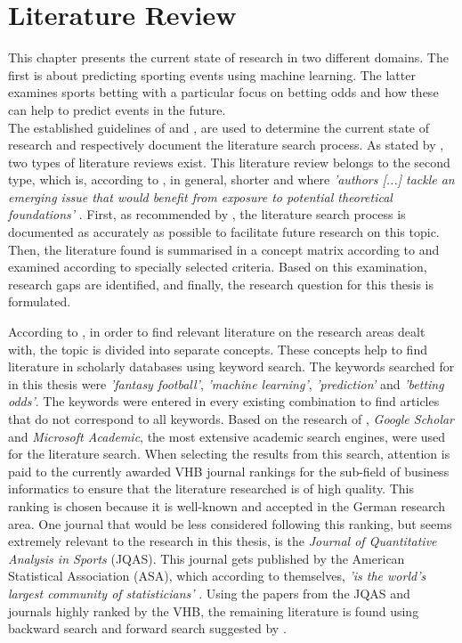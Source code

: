 \chapter{Literature Review}
This chapter presents the current state of research in two different domains. The first is about predicting sporting events using machine learning. The latter examines sports betting with a particular focus on betting odds and how these can help to predict events in the future. \\
\indent The established guidelines of \citet{vom_brocke_standing_2015} and \citet{webster_guest_2002}, are used to determine the current state of research and respectively document the literature search process. As stated by \citet{webster_guest_2002}, two types of literature reviews exist. This literature review belongs to the second type, which is, according to \citeauthor{webster_guest_2002}, in general, shorter and where \emph{'authors [...] tackle an emerging issue that would benefit from exposure to potential theoretical foundations'} \parencite[, p. 14]{webster_guest_2002}. First, as recommended by \citet{vom_brocke_standing_2015}, the literature search process is documented as accurately as possible to facilitate future research on this topic. Then, the literature found is summarised in a concept matrix according to \citet{webster_guest_2002} and examined according to specially selected criteria. Based on this examination, research gaps are identified, and finally, the research question for this thesis is formulated.

According to \citet{vom_brocke_standing_2015}, in order to find relevant literature on the research areas dealt with, the topic is divided into separate concepts. These concepts help to find literature in scholarly databases using keyword search. The keywords searched for in this thesis were \emph{'fantasy football'}, \emph{'machine learning'}, \emph{'prediction'} and \emph{'betting odds'}. The keywords were entered in every existing combination to find articles that do not correspond to all keywords. Based on the research of \citet{gusenbauer_google_2019}, \emph{Google Scholar} and \emph{Microsoft Academic}, the most extensive academic search engines, were used for the literature search. When selecting the results from this search, attention is paid to the currently awarded VHB journal rankings \parencite[see][]{vhb_e_v_vhb-jourqual3_2015} for the sub-field of business informatics to ensure that the literature researched is of high quality. This ranking is chosen because it is well-known and accepted in the German research area. One journal that would be less considered following this ranking, but seems extremely relevant to the research in this thesis, is the \emph{Journal of Quantitative Analysis in Sports} (JQAS). This journal gets published by the American Statistical Association (ASA), which according to themselves, \emph{'is the world's largest community of statisticians'} \parencite[see][]{noauthor_about_nodate}. Using the papers from the JQAS and journals highly ranked by the VHB, the remaining literature is found using backward search and forward search suggested by \citet{webster_guest_2002}.

